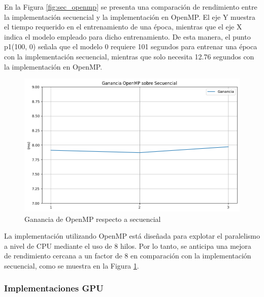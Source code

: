 En la Figura \ref{fig:sec_openmp} se presenta una comparación de rendimiento entre la implementación secuencial y la implementación en OpenMP. El eje Y muestra el tiempo requerido en el entrenamiento de una época, mientras que el eje X indica el modelo empleado para dicho entrenamiento. De esta manera, el punto p1(100, 0) señala que el modelo 0 requiere 101 segundos para entrenar una época con la implementación secuencial, mientras que solo necesita 12.76 segundos con la implementación en OpenMP.

\begin{figure}[H]
	\centering
	\includegraphics[scale=0.5]{imagenes/ganancia_sec_openmp.png}  
	\caption{Ganancia de OpenMP respecto a secuencial}
	\label{fig:ganancia_sec_openmp}
\end{figure}

La implementación utilizando OpenMP está diseñada para explotar el paralelismo a nivel de CPU mediante el uso de 8 hilos. Por lo tanto, se anticipa una mejora de rendimiento cercana a un factor de 8 en comparación con la implementación secuencial, como se muestra en la Figura \ref{fig:ganancia_sec_openmp}.

\vspace{10mm}

\subsubsection{Implementaciones GPU}

